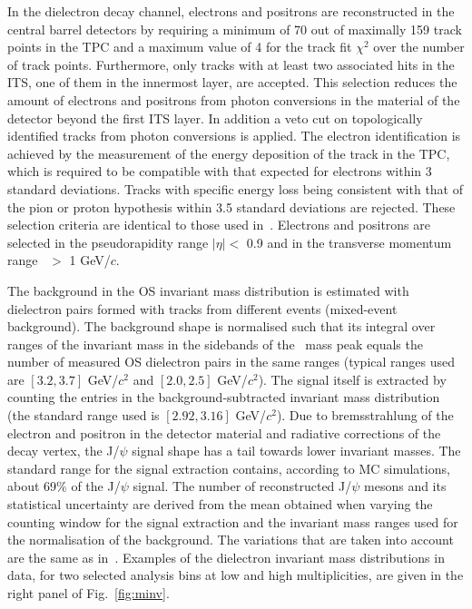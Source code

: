 In the dielectron decay channel, electrons and positrons are reconstructed in the central barrel detectors by requiring a minimum of 70 out of maximally 159 track points in the TPC and a maximum value of 4 for the track fit $\chi^2$ over the number of track points. Furthermore, only tracks with at least two associated hits in the ITS, one of them in the innermost layer, are accepted.  This selection reduces the amount of electrons and positrons from photon conversions in the material of the detector beyond the first ITS layer. In addition a veto cut on topologically identified tracks from photon conversions is applied. The electron identification is achieved by the measurement of the energy deposition of the track in the TPC, which is required to be compatible with that expected for electrons within 3 standard deviations.  Tracks with specific energy loss being consistent with that of the pion or proton hypothesis within 3.5 standard deviations are rejected. These selection criteria are identical to those used in~\cite{Adam:2015jsa}. Electrons and positrons are selected in the pseudorapidity range $|\eta|< $ 0.9 and in the transverse momentum range \pt ~$>$ 1 GeV/$c$. 

The background in the OS invariant mass distribution is estimated with dielectron pairs formed with tracks from different events (mixed-event background). The background shape is normalised such that its integral over ranges of the invariant mass in the sidebands of the \jpsi~mass peak equals the number of measured OS dielectron pairs in the same ranges (typical ranges used are $[3.2,3.7]$ GeV/$c^2$ and $[2.0,2.5]$ GeV/$c^2$). The signal itself is extracted by counting the entries in the background-subtracted invariant mass distribution (the standard range used is $[2.92,3.16]$ GeV/$c^2$). Due to bremsstrahlung of the electron and positron in the detector material and radiative corrections of the decay vertex, the J/$\psi$ signal shape has a tail towards lower invariant masses.
 The standard range for the signal extraction contains, according to MC simulations, about 69\% of the J/$\psi$ signal. The number of reconstructed J/$\psi$ mesons and its statistical uncertainty are derived from the mean obtained when varying the counting window for the signal extraction and the invariant mass ranges used for the normalisation of the background. The variations that are taken into account are the same as in~\cite{Adam:2015jsa}. 
Examples of the dielectron invariant mass distributions in data, for two selected analysis bins at low and high multiplicities, are given in the right panel of Fig.~\ref{fig:minv}.

